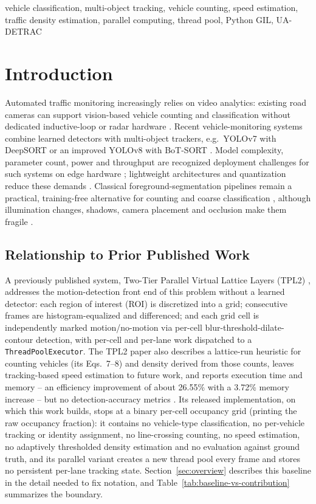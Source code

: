 \documentclass[conference]{IEEEtran}
\newcommand{\code}[1]{\texttt{#1}}
\begin{document}
\begin{IEEEkeywords}
vehicle classification, multi-object tracking, vehicle counting, speed
estimation, traffic density estimation, parallel computing, thread
pool, Python GIL, UA-DETRAC
\end{IEEEkeywords}

\section{Introduction}
\label{sec:intro}

Automated traffic monitoring increasingly relies on video analytics:
existing road cameras can support vision-based vehicle counting and
classification without dedicated inductive-loop or radar hardware
\cite{crouzil2016}. Recent vehicle-monitoring systems combine learned
detectors with multi-object trackers, e.g.\ YOLOv7 with DeepSORT
\cite{lian2025} or an improved YOLOv8 with BoT-SORT \cite{liu2025}.
Model complexity, parameter count, power and throughput are recognized
deployment challenges for such systems on edge hardware \cite{zhai2023};
lightweight architectures and quantization reduce these demands
\cite{chang2025,macko2025}. Classical foreground-segmentation pipelines
remain a practical, training-free alternative for counting and coarse
classification \cite{unzueta2012}, although illumination changes,
shadows, camera placement and occlusion make them fragile
\cite{abbas2021,chen2020}.

\subsection{Relationship to Prior Published Work}
\label{sec:priorwork}
A previously published system, Two-Tier Parallel Virtual Lattice Layers
(TPL2) \cite{baseline}, addresses the motion-detection front end of this
problem without a learned detector: each region of interest (ROI) is
discretized into a grid; consecutive frames are histogram-equalized and
differenced; and each grid cell is independently marked motion/no-motion
via per-cell blur-threshold-dilate-contour detection, with per-cell and
per-lane work dispatched to a \code{ThreadPoolExecutor}. The TPL2 paper
also describes a lattice-run heuristic for counting vehicles (its
Eqs.~7--8) and density derived from those counts, leaves tracking-based
speed estimation to future work, and reports execution time and memory
-- an efficiency improvement of about 26.55\% with a 3.72\% memory
increase -- but no detection-accuracy metrics
\cite{baseline,muthuraja2026}. Its released implementation, on which this
work builds, stops at a binary per-cell occupancy grid (printing the raw
occupancy fraction): it contains no vehicle-type classification, no
per-vehicle tracking or identity assignment, no line-crossing counting,
no speed estimation, no adaptively thresholded density estimation and no
evaluation against ground truth, and its parallel variant creates a new
thread pool every frame and stores no persistent per-lane tracking
state. Section~\ref{sec:overview} describes this baseline in the detail
needed to fix notation, and Table~\ref{tab:baseline-vs-contribution}
summarizes the boundary.
\end{document}
